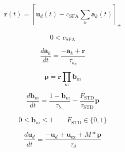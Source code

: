 \documentclass{article}
\begin{document}
\[
\boldsymbol{r}(t) =
\left[
\boldsymbol{u}_d(t) - c_{\text{SFA}} \sum_k \boldsymbol{a}_k(t)
\right]_+
\]

\[
0 < c_{\text{SFA}}
\]

\[
\frac{d \boldsymbol{a}_k}{dt}
= \frac{-\boldsymbol{a}_k + \boldsymbol{r}}{\tau_{a_k}}
\]

\[
\boldsymbol{p} = \boldsymbol{r} \prod_m \boldsymbol{b}_m
\]

\[
\frac{d \boldsymbol{b}_m}{dt}
= \frac{1 - \boldsymbol{b}_m}{\tau_{b_m}} - \frac{F_{\text{STD}}}{\tau_{\text{STD}}} \boldsymbol{p}
\]

\[
0 \leq \boldsymbol{b}_m \leq 1 \qquad F_{\text{STD}} \in \{0, 1\}
\]

\[
\frac{d \boldsymbol{u}_d}{dt}
= \frac{-\boldsymbol{u}_d + \boldsymbol{u}_{\text{ex}} + M * \boldsymbol{p}}{\tau_d}
\]
\end{document}
